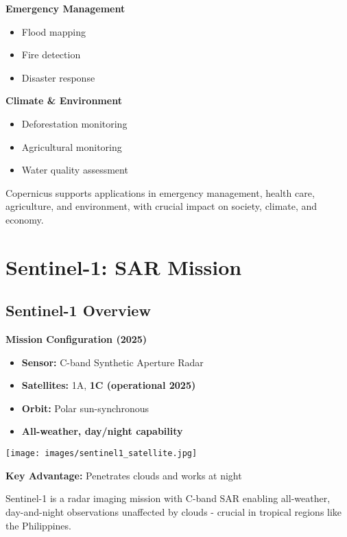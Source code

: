 \documentclass[
  letterpaper,
  DIV=11,
  numbers=noendperiod]{scrartcl}
\providecommand{\tightlist}{%
  \setlength{\itemsep}{0pt}\setlength{\parskip}{0pt}}
\begin{document}
\textbf{Emergency Management}

\begin{itemize}
\tightlist
\item
  Flood mapping
\item
  Fire detection
\item
  Disaster response
\end{itemize}

\textbf{Climate \& Environment}

\begin{itemize}
\tightlist
\item
  Deforestation monitoring
\item
  Agricultural monitoring
\item
  Water quality assessment
\end{itemize}

Copernicus supports applications in emergency management, health care,
agriculture, and environment, with crucial impact on society, climate,
and economy.

\section{Sentinel-1: SAR Mission}\label{sentinel-1-sar-mission}

\subsection{Sentinel-1 Overview}\label{sentinel-1-overview}

\textbf{Mission Configuration (2025)}

\begin{itemize}
\tightlist
\item
  \textbf{Sensor:} C-band Synthetic Aperture Radar
\item
  \textbf{Satellites:} 1A, \textbf{1C (operational 2025)}
\item
  \textbf{Orbit:} Polar sun-synchronous
\item
  \textbf{All-weather, day/night capability}
\end{itemize}

\texttt{[image: images/sentinel1\_satellite.jpg]}

\textbf{Key Advantage:} Penetrates clouds and works at night

Sentinel-1 is a radar imaging mission with C-band SAR enabling
all-weather, day-and-night observations unaffected by clouds - crucial
in tropical regions like the Philippines.
\end{document}
